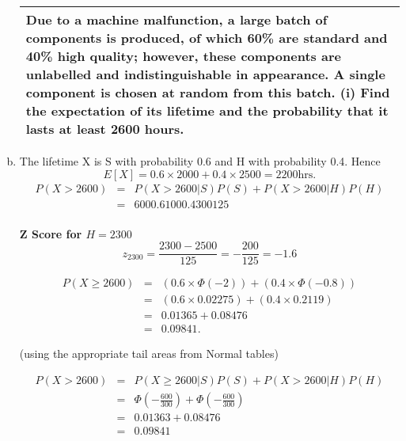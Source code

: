 \documentclass[a4paper,12pt]{article}
\begin{document}
\begin{enumerate}[(a)]
\begin{table}[ht!]
 \centering
 \begin{tabular}{|p{15cm}|}
 \hline
\noindent  Due to a machine malfunction, a large batch of components is produced, of
which 60\% are standard and 40\% high quality; however, these
components are unlabelled and indistinguishable in appearance. A single
component is chosen at random from this batch.
(i) Find the expectation of its lifetime and the probability that it lasts
at least 2600 hours.
\\ \hline
  \end{tabular}
\end{table}
\item The lifetime X is S with probability 0.6 and H with probability 0.4.
Hence \[E[X ] = 0.6×2000 + 0.4× 2500 = 2200 \mbox{hrs} .\]
\begin{eqnarray*}
P( X > 2600) &=& P(X > 2600 | S)P(S ) + P( X > 2600 | H )P(H )\\
 &=& 600 0.6 100 0.4
300 125\\
\end{eqnarray*}


\begin{framed}
\noindent \textbf{Z Score for $H = 2300$}
\[z_{2300}  = \frac{2300 - 2500}{125}  = -\frac{200}{125} = -1.6\]
\end{framed}

\begin{eqnarray*} 
P(X \geq 2600) &=& \left(0.6 \times \Phi(-2)\right) + \left(0.4 \times \Phi(-0.8)\right)\\
&=& \left(0.6 \times 0.02275 \right) + \left(0.4 \times 0.2119\right)\\
 &=& 0.01365 + 0.08476 \\ 
 &=& 0.09841.
\end{eqnarray*}

(using the appropriate tail areas from Normal tables)





\begin{eqnarray*}
P(X > 2600) &=& P(X \geq 2600|S)P(S) + P(X > 2600|H)P(H) \\
 &=& \Phi \left( - \frac{600}{300}\right) + \Phi \left( - \frac{600}{300}\right) \\
 &=& 0.01363 + 0.08476 \\
 &=& 0.09841 \\
\end{eqnarray*}


\end{enumerate}
\end{document}
